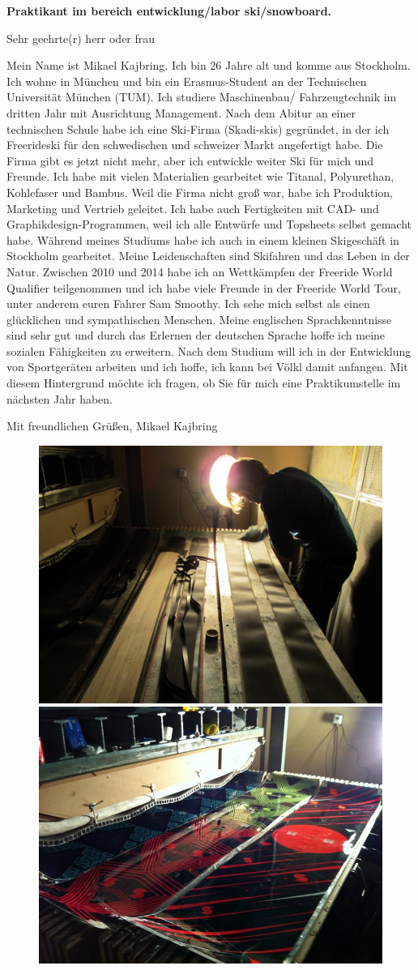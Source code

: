 \documentclass[paper=letter,fontsize=11pt]{scrartcl} %
\newcommand{\sepspace}{\vspace*{1em}}		%
\newcommand{\Textlong}[4]{
		\noindent \textbf{#1} \par
        \sepspace
        \noindent \small #2
        \par\sepspace      
		\noindent \small #3
        \par\sepspace      
		\noindent \small #4
        \normalsize \par}
\begin{document}
\Textlong{Praktikant im bereich entwicklung/labor ski/snowboard.}{Sehr geehrte(r) herr oder frau}{Mein Name ist Mikael Kajbring. Ich bin 26 Jahre alt und komme aus Stockholm. Ich wohne in München und bin ein Erasmus-Student an der Technischen Universität München (TUM). Ich studiere Maschinenbau/ Fahrzeugtechnik im dritten Jahr mit Ausrichtung Management. Nach dem Abitur an einer technischen Schule habe ich eine Ski-Firma (Skadi-skis) gegründet, in der ich Freerideski für den schwedischen und schweizer Markt angefertigt habe. Die Firma gibt es jetzt nicht mehr, aber ich entwickle weiter Ski für mich und Freunde. Ich habe mit vielen Materialien gearbeitet wie Titanal, Polyurethan, Kohlefaser und Bambus. Weil die Firma nicht groß war, habe ich Produktion, Marketing und Vertrieb geleitet. Ich habe auch Fertigkeiten mit CAD- und Graphikdesign-Programmen, weil ich alle Entwürfe und Topsheets selbst gemacht habe. Während meines Studiums habe ich auch in einem kleinen Skigeschäft in Stockholm gearbeitet. 
Meine Leidenschaften sind Skifahren und das Leben in der Natur. Zwischen 2010 und 2014 habe ich an Wettkämpfen der Freeride World Qualifier teilgenommen und ich habe viele Freunde in der Freeride World Tour, unter anderem euren Fahrer Sam Smoothy. 
Ich sehe mich selbst als einen glücklichen und sympathischen Menschen. Meine englischen Sprachkenntnisse sind sehr gut und durch das Erlernen der deutschen Sprache hoffe ich meine sozialen Fähigkeiten zu erweitern. Nach dem Studium will ich in der Entwicklung von Sportgeräten arbeiten und ich hoffe, ich kann bei Völkl damit anfangen.
Mit diesem Hintergrund möchte ich fragen, ob Sie für mich eine Praktikumstelle im nächsten Jahr haben.}{Mit freundlichen Grüßen, Mikael Kajbring}

\sepspace

\begin{figure}
		\vspace{5em}
        \centering
		\includegraphics[height=0.25\textwidth]{IMG_0068.JPG}
        \hspace{1em}
        \includegraphics[height=0.25\textwidth]{154327_165817636790533_1488132_n.jpg}
        
\end{figure}
\end{document}
